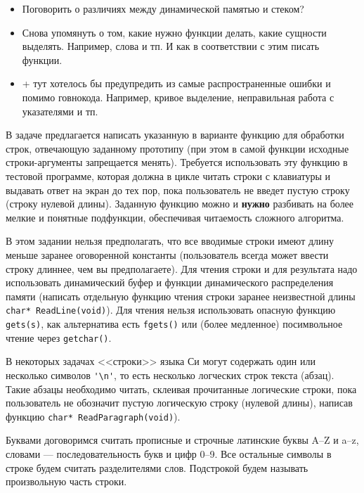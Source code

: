 
\begin{itemize}
    \item Поговорить о различиях между динамической памятью и стеком?
    \item Снова упомянуть о том, какие нужно функции делать, какие сущности выделять. Например, слова и тп. И как в соответствии с этим писать функции.
    \item + тут хотелось бы предупредить из самые распространенные ошибки и помимо говнокода. Например, кривое выделение, неправильная работа с указателями и тп.
\end{itemize}

В задаче предлагается написать указанную в варианте функцию для обработки строк,
отвечающую заданному прототипу (при этом в самой функции исходные строки-аргументы
запрещается менять). Требуется использовать эту функцию в тестовой программе,
которая должна в цикле читать строки с клавиатуры и выдавать ответ на экран до
тех пор, пока пользователь не введет пустую строку (строку нулевой длины). 
Заданную функцию можно и \textbf{нужно} разбивать на более мелкие и понятные
подфункции, обеспечивая читаемость сложного алгоритма.

В этом задании нельзя предполагать, что все вводимые строки имеют длину меньше
заранее оговоренной константы (пользователь всегда может ввести строку длиннее,
чем вы предполагаете). Для чтения строки и для результата надо использовать
динамический буфер и функции динамического распределения памяти (написать отдельную
функцию чтения строки заранее неизвестной длины \texttt{char* ReadLine(void)}).
Для чтения нельзя использовать опасную функцию \texttt{gets(s)},
как альтернатива есть \texttt{fgets()} или (более медленное) посимвольное чтение
через \texttt{getchar()}.

В некоторых задачах <<строки>> языка Си
могут содержать один или несколько символов \verb|'\n'|, то есть несколько
логческих строк текста (абзац). Такие абзацы необходимо читать, склеивая
прочитанные логические строки, пока пользователь не обозначит пустую логическую
строку (нулевой длины), написав функцию \texttt{char* ReadParagraph(void)}).

Буквами договоримся считать прописные и строчные латинские буквы 
A--Z и a--z, словами --- последовательность букв и цифр 0--9. Все остальные
символы в строке будем считать разделителями слов. Подстрокой будем называть
произвольную часть строки.

